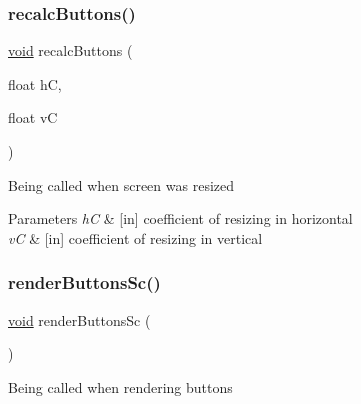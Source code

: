 \subsubsection{\texorpdfstring{recalc\+Buttons()}{recalcButtons()}}
{\footnotesize\ttfamily \hyperlink{png_8h_ac9c84fa68bbad002983e35ce3663c686}{void} recalc\+Buttons (\begin{DoxyParamCaption}\item[{float}]{hC,  }\item[{float}]{vC }\end{DoxyParamCaption})}

Being called when screen was resized 
\begin{DoxyParams}{Parameters}
{\em hC} & \mbox{[}in\mbox{]} coefficient of resizing in horizontal \\
\hline
{\em vC} & \mbox{[}in\mbox{]} coefficient of resizing in vertical \\
\hline
\end{DoxyParams}
\mbox{\label{group___button_ga49f288b060f05a3b0333a0d2d004754d}} 
\subsubsection{\texorpdfstring{render\+Buttons\+Sc()}{renderButtonsSc()}}
{\footnotesize\ttfamily \hyperlink{png_8h_ac9c84fa68bbad002983e35ce3663c686}{void} render\+Buttons\+Sc (\begin{DoxyParamCaption}{ }\end{DoxyParamCaption})}

Being called when rendering buttons 